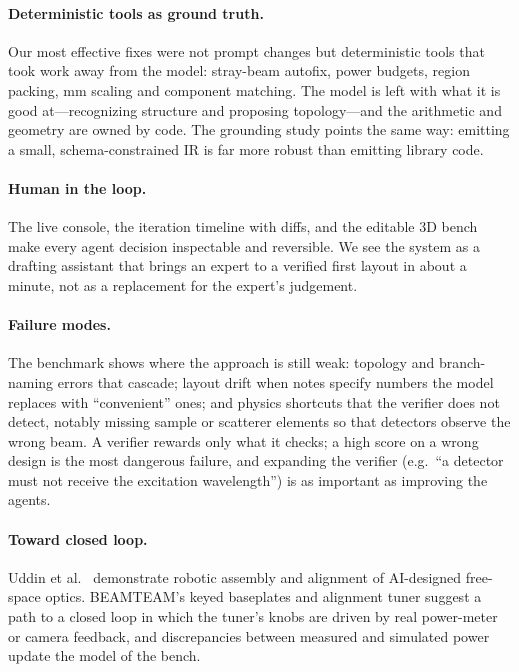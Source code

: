 \documentclass[10pt,twocolumn,letterpaper]{article}
\begin{document}
\paragraph{Deterministic tools as ground truth.} Our most effective fixes were not prompt changes but deterministic tools that took work away from the model: stray-beam autofix, power budgets, region packing, mm scaling and component matching. The model is left with what it is good at---recognizing structure and proposing topology---and the arithmetic and geometry are owned by code. The grounding study points the same way: emitting a small, schema-constrained IR is far more robust than emitting library code.

\paragraph{Human in the loop.} The live console, the iteration timeline with diffs, and the editable 3D bench make every agent decision inspectable and reversible. We see the system as a drafting assistant that brings an expert to a verified first layout in about a minute, not as a replacement for the expert's judgement.

\paragraph{Failure modes.} The benchmark shows where the approach is still weak: topology and branch-naming errors that cascade; layout drift when notes specify numbers the model replaces with ``convenient'' ones; and physics shortcuts that the verifier does not detect, notably missing sample or scatterer elements so that detectors observe the wrong beam. A verifier rewards only what it checks; a high score on a wrong design is the most dangerous failure, and expanding the verifier (e.g.\ ``a detector must not receive the excitation wavelength'') is as important as improving the agents.

\paragraph{Toward closed loop.} Uddin et al.~\cite{optomate2025} demonstrate robotic assembly and alignment of AI-designed free-space optics. BEAMTEAM's keyed baseplates and alignment tuner suggest a path to a closed loop in which the tuner's knobs are driven by real power-meter or camera feedback, and discrepancies between measured and simulated power update the model of the bench.
\end{document}
